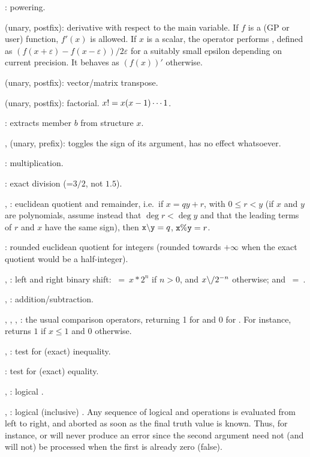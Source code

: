 %
\kbd{\pow}: powering.

 (unary, postfix): derivative with respect to the main variable. If
$f$ is a (GP or user) function, $f'(x)$ is allowed. If $x$ is a scalar, the
operator performs , defined as $(f(x+\varepsilon) -
f(x-\varepsilon)) / 2\varepsilon$ for a suitably small epsilon depending on
current precision. It behaves as $(f(x))'$ otherwise.

\strut\kbd{\til} (unary, postfix): vector/matrix transpose.

\kbd{!} (unary, postfix): factorial. $x{\tt !}=x(x-1)\cdots 1$.

:  extracts member $b$ from structure $x$.

%
\kbd{+}, \kbd{-} (unary, prefix): \kbd{-} toggles the sign of its argument,
\kbd{+} has no effect whatsoever.

%
\kbd{*}: multiplication.

\kbd{/}: exact division (=$3/2$, not $1.5$).

\kbd{\bs}, \kbd{\%}: euclidean quotient and remainder, i.e.~if $x =
qy + r$, with $0\le r < y$ (if $x$ and $y$ are polynomials, assume instead
that $\deg r< \deg y$ and that the leading terms of $r$ and $x$ have the
same sign), then $\kbd{x \b{ } y} = q$, ${\tt x\%y} = r$.

\kbd{\bs/}: rounded euclidean quotient for integers (rounded towards
$+\infty$ when the exact quotient would be a half-integer).

\kbd{<<}, \kbd{>>}: left and right binary shift: $~=~x * 2^n$
if $n>0$, and $x \b{/} 2^{-n}$ otherwise; and
$~=~$.

%
\kbd{+}, \kbd{-}: addition/subtraction.

%
\kbd{<}, \kbd{>}, \kbd{<=}, \kbd{>=}: the usual comparison operators,
returning 1 for  and 0 for . For instance,
 returns $1$ if $x\le 1$ and $0$ otherwise.

\kbd{<>}, \kbd{!=}: test for (exact) inequality.

\kbd{==}: test for (exact) equality.

%
\kbd{\&}, \kbd{\&\&}: logical .

\kbd{|}, \kbd{||}: logical (inclusive) . Any sequence of logical
 and  operations is evaluated from left to right,
and aborted as soon as the final truth value is known. Thus, for instance,
 or  will never
produce an error since the second argument need not (and will not) be processed
when the first is already zero (false).

